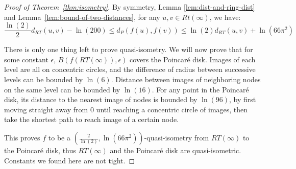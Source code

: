 \documentclass[11pt]{article}
\begin{document}
\begin{proof}[Proof of Theorem~\ref{thm:isometry}]
By symmetry, Lemma \ref{lem:dist-and-ring-dist} and Lemma~\ref{lem:bound-of-two-distances}, for any $u,v \in Rt(\infty)$, we have:
\[ \frac{\ln(2)}{2}d_{RT}(u,v) - \ln(200) \leq d_{P}(f(u),f(v)) \leq \ln(2)d_{RT}(u,v) + \ln(66 \pi^{2}) \]

There is only one thing left to prove quasi-isometry. We will now prove that for some constant $\epsilon$, $B(f(RT(\infty)),\epsilon)$ covers the Poincar\'{e} disk. Images of each level are all on concentric circles, and the difference of radius between successive levels can be bounded by $\ln(6)$. Distance between images of neighboring nodes on the same level can be bounded by $\ln(16)$. For any point in the Poincar\'{e} disk, its distance to the nearest image of nodes is bounded by $\ln(96)$, by first moving straight away from $0$ until reaching a concentric circle of images, then take the shortest path to reach image of a certain node.

This proves $f$ to be a $(\frac{2}{\ln(2)},\ln(66 \pi^{2}))$-quasi-isometry from $RT(\infty)$ to the Poincar\'{e} disk, thus $RT(\infty)$ and the Poincar\'{e} disk are quasi-isometric. Constants we found here are not tight.
\end{proof}





\end{document}
